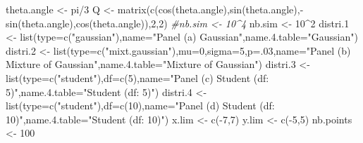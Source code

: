 \documentclass[
]{book}
\newenvironment{Shaded}{\begin{snugshade}}{\end{snugshade}}
\newcommand{\AttributeTok}[1]{\textcolor[rgb]{0.77,0.63,0.00}{#1}}
\newcommand{\CommentTok}[1]{\textcolor[rgb]{0.56,0.35,0.01}{\textit{#1}}}
\newcommand{\DecValTok}[1]{\textcolor[rgb]{0.00,0.00,0.81}{#1}}
\newcommand{\FloatTok}[1]{\textcolor[rgb]{0.00,0.00,0.81}{#1}}
\newcommand{\FunctionTok}[1]{\textcolor[rgb]{0.00,0.00,0.00}{#1}}
\newcommand{\NormalTok}[1]{#1}
\newcommand{\OtherTok}[1]{\textcolor[rgb]{0.56,0.35,0.01}{#1}}
\newcommand{\SpecialCharTok}[1]{\textcolor[rgb]{0.00,0.00,0.00}{#1}}
\newcommand{\StringTok}[1]{\textcolor[rgb]{0.31,0.60,0.02}{#1}}
\theoremstyle{definition}
\theoremstyle{definition}
\theoremstyle{definition}
\theoremstyle{definition}
\theoremstyle{remark}
\begin{document}
\begin{Shaded}
\begin{Highlighting}[]
\NormalTok{theta.angle }\OtherTok{\textless{}{-}}\NormalTok{ pi}\SpecialCharTok{/}\DecValTok{3}
\NormalTok{Q }\OtherTok{\textless{}{-}} \FunctionTok{matrix}\NormalTok{(}\FunctionTok{c}\NormalTok{(}\FunctionTok{cos}\NormalTok{(theta.angle),}\FunctionTok{sin}\NormalTok{(theta.angle),}\SpecialCharTok{{-}}\FunctionTok{sin}\NormalTok{(theta.angle),}\FunctionTok{cos}\NormalTok{(theta.angle)),}\DecValTok{2}\NormalTok{,}\DecValTok{2}\NormalTok{)}
\CommentTok{\#nb.sim \textless{}{-} 10\^{}4}
\NormalTok{nb.sim }\OtherTok{\textless{}{-}} \DecValTok{10}\SpecialCharTok{\^{}}\DecValTok{2}
\NormalTok{distri}\FloatTok{.1} \OtherTok{\textless{}{-}} \FunctionTok{list}\NormalTok{(}\AttributeTok{type=}\FunctionTok{c}\NormalTok{(}\StringTok{"gaussian"}\NormalTok{),}\AttributeTok{name=}\StringTok{"Panel (a) Gaussian"}\NormalTok{,}\AttributeTok{name.4.table=}\StringTok{"Gaussian"}\NormalTok{)}
\NormalTok{distri}\FloatTok{.2} \OtherTok{\textless{}{-}} \FunctionTok{list}\NormalTok{(}\AttributeTok{type=}\FunctionTok{c}\NormalTok{(}\StringTok{"mixt.gaussian"}\NormalTok{),}\AttributeTok{mu=}\DecValTok{0}\NormalTok{,}\AttributeTok{sigma=}\DecValTok{5}\NormalTok{,}\AttributeTok{p=}\NormalTok{.}\DecValTok{03}\NormalTok{,}\AttributeTok{name=}\StringTok{"Panel (b) Mixture of Gaussian"}\NormalTok{,}\AttributeTok{name.4.table=}\StringTok{"Mixture of Gaussian"}\NormalTok{)}
\NormalTok{distri}\FloatTok{.3} \OtherTok{\textless{}{-}} \FunctionTok{list}\NormalTok{(}\AttributeTok{type=}\FunctionTok{c}\NormalTok{(}\StringTok{"student"}\NormalTok{),}\AttributeTok{df=}\FunctionTok{c}\NormalTok{(}\DecValTok{5}\NormalTok{),}\AttributeTok{name=}\StringTok{"Panel (c) Student (df: 5)"}\NormalTok{,}\AttributeTok{name.4.table=}\StringTok{"Student (df: 5)"}\NormalTok{)}
\NormalTok{distri}\FloatTok{.4} \OtherTok{\textless{}{-}} \FunctionTok{list}\NormalTok{(}\AttributeTok{type=}\FunctionTok{c}\NormalTok{(}\StringTok{"student"}\NormalTok{),}\AttributeTok{df=}\FunctionTok{c}\NormalTok{(}\DecValTok{10}\NormalTok{),}\AttributeTok{name=}\StringTok{"Panel (d) Student (df: 10)"}\NormalTok{,}\AttributeTok{name.4.table=}\StringTok{"Student (df: 10)"}\NormalTok{)}
\NormalTok{x.lim }\OtherTok{\textless{}{-}} \FunctionTok{c}\NormalTok{(}\SpecialCharTok{{-}}\DecValTok{7}\NormalTok{,}\DecValTok{7}\NormalTok{)}
\NormalTok{y.lim }\OtherTok{\textless{}{-}} \FunctionTok{c}\NormalTok{(}\SpecialCharTok{{-}}\DecValTok{5}\NormalTok{,}\DecValTok{5}\NormalTok{)}
\NormalTok{nb.points }\OtherTok{\textless{}{-}} \DecValTok{100}

\end{Highlighting}
\end{Shaded}
\end{document}
